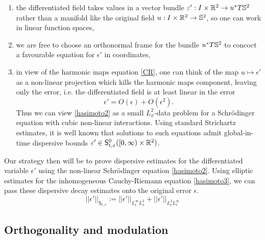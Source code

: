     \begin{enumerate}
        \item the differentiated field takes values in a vector bundle $\varepsilon' : I \times \mathbb R^2 \to u^* T \mathbb S^2$ rather than a manifold like the original field $u: I \times \mathbb R^2 \to \mathbb S^2$, so one can work in linear function spaces,
        
        \item we are free to choose an orthonormal frame for the bundle $u^* T\mathbb S^2$ to concoct a favourable equation for $\epsilon'$ in coordinates, 
        
        \item in view of the harmonic maps equation \eqref{CR}, one can think of the map $u \mapsto \epsilon'$ as a non-linear projection which kills the harmonic maps component, leaving only the error, i.e. the differentiated field is at least linear in the error 
            \[
                \epsilon' = O(\epsilon) + O(\epsilon^2).
            \] 
        Thus we can view \eqref{hasimoto2} as a small $L^2_x$-data problem for a Schr\"odinger equation with cubic non-linear interactions. Using standard Strichartz estimates, it is well known that solutions to such equations admit global-in-time dispersive bounds $\varepsilon' \in \mathsf S_{t, x}^0 ([0, \infty) \times \mathbb R^2)$. 
    \end{enumerate}
Our strategy then will be to prove dispersive estimates for the differentiated variable $\epsilon'$ using the non-linear Schr\"odinger equation \eqref{hasimoto2}. Using elliptic estimates for the inhomogeneous Cauchy-Riemann equation \eqref{hasimoto3}, we can pass these dispersive decay estimates onto the original error $\epsilon$. 
    \[
        ||\epsilon'||_{\mathsf S_{t, x}}
            := ||\epsilon'||_{L^\infty_t L^2_x} + || \epsilon'||_{L^2_t L^\infty_x}
    \]





\subsection{Orthogonality and modulation}

